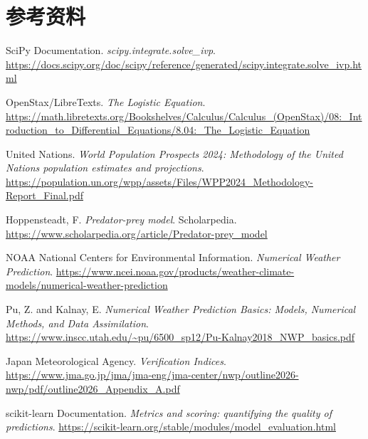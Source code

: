 \documentclass[11pt,a4paper]{ctexart}
\begin{document}
\section*{参考资料}
\begin{enumerate}[label={[\arabic*]},itemsep=0.25em]
\item SciPy Documentation. \textit{scipy.integrate.solve\_ivp}. \url{https://docs.scipy.org/doc/scipy/reference/generated/scipy.integrate.solve_ivp.html}
\item OpenStax/LibreTexts. \textit{The Logistic Equation}. \url{https://math.libretexts.org/Bookshelves/Calculus/Calculus_(OpenStax)/08:_Introduction_to_Differential_Equations/8.04:_The_Logistic_Equation}
\item United Nations. \textit{World Population Prospects 2024: Methodology of the United Nations population estimates and projections}. \url{https://population.un.org/wpp/assets/Files/WPP2024_Methodology-Report_Final.pdf}
\item Hoppensteadt, F. \textit{Predator-prey model}. Scholarpedia. \url{https://www.scholarpedia.org/article/Predator-prey_model}
\item NOAA National Centers for Environmental Information. \textit{Numerical Weather Prediction}. \url{https://www.ncei.noaa.gov/products/weather-climate-models/numerical-weather-prediction}
\item Pu, Z. and Kalnay, E. \textit{Numerical Weather Prediction Basics: Models, Numerical Methods, and Data Assimilation}. \url{https://www.inscc.utah.edu/~pu/6500_sp12/Pu-Kalnay2018_NWP_basics.pdf}
\item Japan Meteorological Agency. \textit{Verification Indices}. \url{https://www.jma.go.jp/jma/jma-eng/jma-center/nwp/outline2026-nwp/pdf/outline2026_Appendix_A.pdf}
\item scikit-learn Documentation. \textit{Metrics and scoring: quantifying the quality of predictions}. \url{https://scikit-learn.org/stable/modules/model_evaluation.html}
\end{enumerate}
\end{document}
